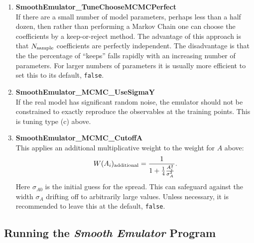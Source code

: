 \documentclass[UserManual.tex]{subfiles}
\begin{document}
\begin{enumerate}
\item {\bf SmoothEmulator\_TuneChooseMCMCPerfect}\\
If there are a small number of model parameters, perhaps less than a half dozen, then rather than performing a Markov Chain one can choose the coefficients by a keep-or-reject method. The advantage of this approach is that $N_{\rm sample}$ coefficients are perfectly independent. The disadvantage is that the the percentage of ``keeps'' falls rapidly with an increasing number of parameters. For larger numbers of parameters it is usually more efficient to set this to its default, {\tt false}. 

\item {\bf SmoothEmulator\_MCMC\_UseSigmaY}\\
If the real model has significant random noise, the emulator should not be constrained to exactly reproduce the observables at the training points. This is tuning type (c) above. 

\item {\bf SmoothEmulator\_MCMC\_CutoffA}\\
This applies an additional multiplicative weight to the weight for $A$ above:
\[
W(A_i)_{\rm additional}=\frac{1}{1+\frac{1}{4}\frac{A_i^2}{\sigma_{A}^2}}.
\] 
Here $\sigma_{A0}$ is the initial guess for the spread. This can safeguard against the width $\sigma_A$ drifting off to arbitrarily large values. Unless necessary, it is recommended to leave this at the default, {\tt false}.

\end{enumerate}

\subsection{Running the {\it Smooth Emulator} Program}
\end{document}
